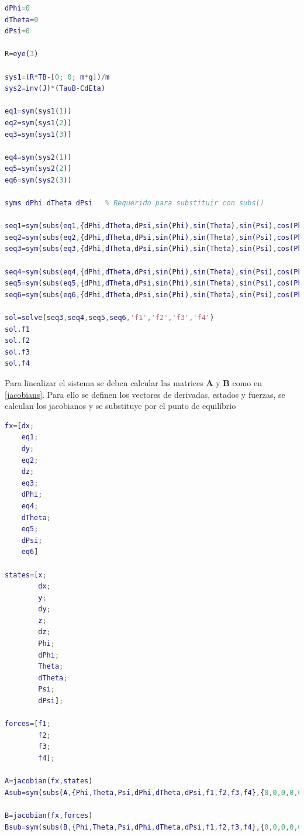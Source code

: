 \documentclass[twoside,11pt]{book}
\begin{document}
\singlespacing
\begin{lstlisting}[language=Matlab,firstnumber=68]
dPhi=0
dTheta=0
dPsi=0

R=eye(3)

sys1=(R*TB-[0; 0; m*g])/m
sys2=inv(J)*(TauB-CdEta)

eq1=sym(sys1(1))
eq2=sym(sys1(2))
eq3=sym(sys1(3))

eq4=sym(sys2(1))
eq5=sym(sys2(2))
eq6=sym(sys2(3))

syms dPhi dTheta dPsi 	% Requerido para substituir con subs()

seq1=sym(subs(eq1,{dPhi,dTheta,dPsi,sin(Phi),sin(Theta),sin(Psi),cos(Phi),cos(Theta),cos(Psi)},{0,0,0,0,0,0,1,1,1}))
seq2=sym(subs(eq2,{dPhi,dTheta,dPsi,sin(Phi),sin(Theta),sin(Psi),cos(Phi),cos(Theta),cos(Psi)},{0,0,0,0,0,0,1,1,1}))
seq3=sym(subs(eq3,{dPhi,dTheta,dPsi,sin(Phi),sin(Theta),sin(Psi),cos(Phi),cos(Theta),cos(Psi)},{0,0,0,0,0,0,1,1,1}))

seq4=sym(subs(eq4,{dPhi,dTheta,dPsi,sin(Phi),sin(Theta),sin(Psi),cos(Phi),cos(Theta),cos(Psi)},{0,0,0,0,0,0,1,1,1}))
seq5=sym(subs(eq5,{dPhi,dTheta,dPsi,sin(Phi),sin(Theta),sin(Psi),cos(Phi),cos(Theta),cos(Psi)},{0,0,0,0,0,0,1,1,1}))
seq6=sym(subs(eq6,{dPhi,dTheta,dPsi,sin(Phi),sin(Theta),sin(Psi),cos(Phi),cos(Theta),cos(Psi)},{0,0,0,0,0,0,1,1,1}))

sol=solve(seq3,seq4,seq5,seq6,'f1','f2','f3','f4')
sol.f1
sol.f2
sol.f3
sol.f4
\end{lstlisting}
\onehalfspacing

Para linealizar el sistema se deben calcular las matrices $\mathbf{A}$ y $\mathbf{B}$ como en  \ref{jacobians}. Para ello se definen los vectores de derivadas, estados y fuerzas, se calculan los jacobianos y se substituye por el punto de equilibrio

\singlespacing
\begin{lstlisting}[language=Matlab,firstnumber=100]
fx=[dx;
    eq1;
    dy;
    eq2;
    dz;
    eq3;
    dPhi;
    eq4;
    dTheta;
    eq5;
    dPsi;
    eq6]

states=[x;
        dx;
        y;
        dy;
        z;
        dz;
        Phi;
        dPhi;
        Theta;
        dTheta;
        Psi;
        dPsi];

forces=[f1;
        f2;
        f3;
        f4];  
        
A=jacobian(fx,states)
Asub=sym(subs(A,{Phi,Theta,Psi,dPhi,dTheta,dPsi,f1,f2,f3,f4},{0,0,0,0,0,0,m*g/4,m*g/4,m*g/4,m*g/4}))

B=jacobian(fx,forces)
Bsub=sym(subs(B,{Phi,Theta,Psi,dPhi,dTheta,dPsi,f1,f2,f3,f4},{0,0,0,0,0,0,m*g/4,m*g/4,m*g/4,m*g/4}))        
\end{lstlisting}
\onehalfspacing
\end{document}
